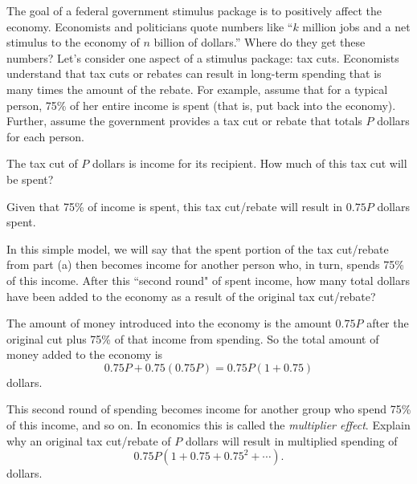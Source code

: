 \begin{exercises}
  \item The goal of a federal government stimulus package is to positively affect the economy. Economists and politicians quote numbers like ``$k$ million jobs and a net stimulus to the economy of $n$ billion of dollars.'' Where do they get these numbers? Let's consider one aspect of a stimulus package: tax cuts. Economists understand that tax cuts or rebates can result in long-term spending that is many times the amount of the rebate. For example, assume that for a typical person, 75\% of her entire income is spent (that is, put back into the economy). Further, assume the government provides a tax cut or rebate that totals $P$ dollars for each person.
      \ba
      \item The tax cut of $P$ dollars is income for its recipient. How much of this tax cut will be spent?

\begin{exerciseSolution}

Given that 75\% of income is spent, this tax cut/rebate will result in $0.75P$ dollars spent.

\end{exerciseSolution}

    \item In this simple model, we will say that the spent portion of the tax cut/rebate from part (a) then becomes income for another person who, in turn, spends 75\% of this income. After this ``second round" of spent income, how many total dollars have been added to the economy as a result of the original tax cut/rebate?

\begin{exerciseSolution}

The amount of money introduced into the economy is the amount $0.75P$ after the original cut plus 75\% of that income from spending. So the total amount of money added to the economy is
\[0.75P + 0.75(0.75P) = 0.75P(1+0.75)\]
dollars.

\end{exerciseSolution}

    \item This second round of spending becomes income for another group who spend 75\% of this income, and so on. In economics this is called the \emph{multiplier effect}. Explain why an original tax cut/rebate of $P$ dollars will result in multiplied spending of
\[0.75P(1+0.75+0.75^2+ \cdots ).\]
dollars.

\begin{exerciseSolution}


\end{exerciseSolution}
\end{exercises}
